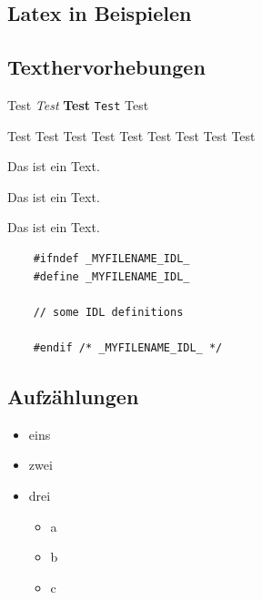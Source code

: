 \begin{appendix}

\chapter{Latex in Beispielen}

\section{Texthervorhebungen}

Test {\it Test} {\bf Test} {\tt Test} {\sc Test}

\tiny{Test} \small{Test} \normalsize{Test} \large{Test} \Large{Test}
\LARGE{Test} \huge{Test} \Huge{Test}
\normalsize{Test}

\begin{center}
Das ist ein Text. 
\end{center}

\begin{flushleft}
Das ist ein Text.
\end{flushleft}

\begin{flushright}
Das 
ist 
ein 
Text.

\end{flushright}

\begin{verbatim}
    #ifndef _MYFILENAME_IDL_
    #define _MYFILENAME_IDL_
    
    // some IDL definitions

    #endif /* _MYFILENAME_IDL_ */
\end{verbatim}

\newpage

\section{Aufzählungen}

\begin{itemize}
  \item eins
  \item zwei
  \item drei
  \begin{itemize}
    \item a
    \item b
    \item c
  \end{itemize}
\end{itemize}


\end{appendix}
